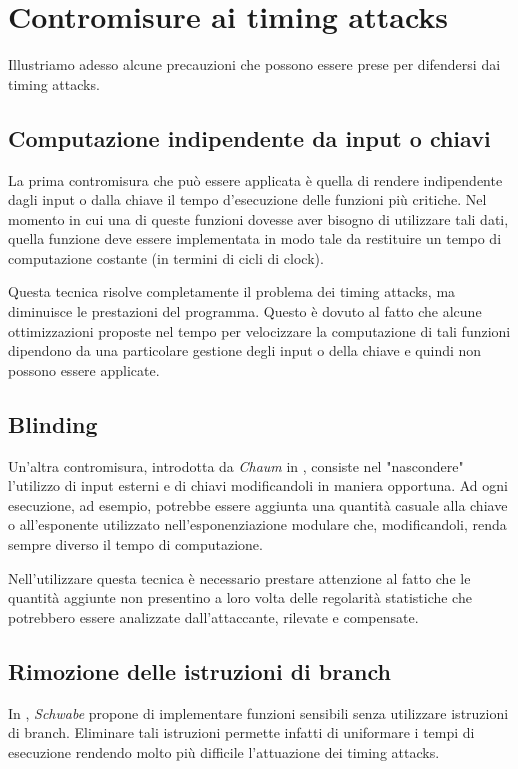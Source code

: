 	\section{Contromisure ai timing attacks}
	Illustriamo adesso alcune precauzioni che possono essere prese per difendersi dai timing attacks.
	
	\subsection*{Computazione indipendente da input o chiavi}
		La prima contromisura che può essere applicata è quella di rendere indipendente dagli input o dalla chiave il tempo d'esecuzione delle funzioni più critiche. Nel momento in cui una di queste funzioni dovesse aver bisogno di utilizzare tali dati, quella funzione deve essere implementata in modo tale da restituire un tempo di computazione costante (in termini di cicli di clock).
		
		Questa tecnica risolve completamente il problema dei timing attacks, ma diminuisce le prestazioni del programma. Questo è dovuto al fatto che alcune ottimizzazioni proposte nel tempo per velocizzare la computazione di tali funzioni dipendono da una particolare gestione degli input o della chiave e quindi non possono essere applicate.
		
	\subsection*{Blinding}
		Un'altra contromisura, introdotta da \emph{Chaum} in \cite{chaum1983blind}, consiste nel "nascondere" l'utilizzo di input esterni e di chiavi modificandoli in maniera opportuna. Ad ogni esecuzione, ad esempio, potrebbe essere aggiunta una quantità casuale alla chiave o all'esponente utilizzato nell'esponenziazione modulare che, modificandoli, renda sempre diverso il tempo di computazione.
		
		Nell'utilizzare questa tecnica è necessario prestare attenzione al fatto che le quantità aggiunte non presentino a loro volta delle regolarità statistiche che potrebbero essere analizzate dall'attaccante, rilevate e compensate.
		
	\subsection*{Rimozione delle istruzioni di branch}
		In \cite{schwabe2016counter}, \emph{Schwabe} propone di implementare funzioni sensibili senza utilizzare istruzioni di branch. Eliminare tali istruzioni permette infatti di uniformare i tempi di esecuzione rendendo molto più difficile l'attuazione dei timing attacks.
		
